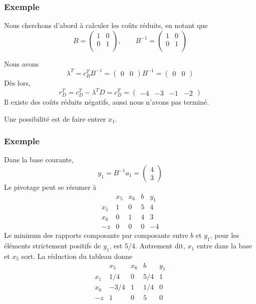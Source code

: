 \documentclass[usepdftitle=false]{beamer}
\begin{document}
\begin{frame}
\frametitle{Exemple}

Nous cherchons d'abord à calculer les coûts réduits, en notant que
\[
B = \begin{pmatrix}
1 & 0 \\
0 & 1 \\
\end{pmatrix},\qquad 
B^{-1} = \begin{pmatrix}
1 & 0 \\
0 & 1 \\
\end{pmatrix}
\]

Nous avons
\[
\lambda^T = c_B^T B^{-1} =
\begin{pmatrix} 0 & 0 \end{pmatrix}B^{-1} = \begin{pmatrix} 0 & 0 \end{pmatrix}
\]
Dès lors,
\[
r_D^T = c_D^T - \lambda^T D = c_D^T =
\begin{pmatrix} -4 & -3 & -1 & -2 \end{pmatrix}
\]
Il existe des coûts réduits négatifs, aussi nous n'avons pas terminé.

\mbox{}

Une possibilité est de faire entrer $x_1$.

\end{frame}

\begin{frame}
\frametitle{Exemple}

Dans la base courante,
\[
y_1 = B^{-1}a_1 = \begin{pmatrix} 4 \\ 3 \end{pmatrix}
\]
Le pivotage peut se résumer à
\[
\begin{matrix}
    & x_5 & x_6 & b & y_1 \\
x_5 & 1 & 0 & 5 & 4 \\
x_6 & 0 & 1 & 4 & 3 \\
-z & 0 & 0 & 0 & -4
\end{matrix}
\]
Le mininum des rapports composante par composante entre $b$ et $y_1$, pour les éléments strictement positifs de $y_1$, est 5/4. Autrement dit, $x_1$ entre dans la base et $x_5$ sort.
La réduction du tableau donne
\[
\begin{matrix}
    & x_5 & x_6 & b & y_1 \\
x_1 & 1/4 & 0 & 5/4 & 1 \\
x_6 & -3/4 & 1 & 1/4 & 0 \\
-z & 1 & 0 & 5 & 0
\end{matrix}
\]

\end{frame}
\end{document}
